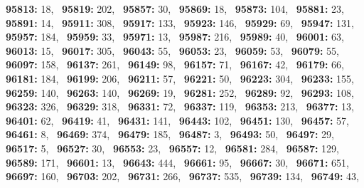 \textbf{95813:} 18,\allowbreak~ 
\textbf{95819:} 202,\allowbreak~ 
\textbf{95857:} 30,\allowbreak~ 
\textbf{95869:} 18,\allowbreak~ 
\textbf{95873:} 104,\allowbreak~ 
\textbf{95881:} 23,\allowbreak~ 
\textbf{95891:} 14,\allowbreak~ 
\textbf{95911:} 308,\allowbreak~ 
\textbf{95917:} 133,\allowbreak~ 
\textbf{95923:} 146,\allowbreak~ 
\textbf{95929:} 69,\allowbreak~ 
\textbf{95947:} 131,\allowbreak~ 
\textbf{95957:} 184,\allowbreak~ 
\textbf{95959:} 33,\allowbreak~ 
\textbf{95971:} 13,\allowbreak~ 
\textbf{95987:} 216,\allowbreak~ 
\textbf{95989:} 40,\allowbreak~ 
\textbf{96001:} 63,\allowbreak~ 
\textbf{96013:} 15,\allowbreak~ 
\textbf{96017:} 305,\allowbreak~ 
\textbf{96043:} 55,\allowbreak~ 
\textbf{96053:} 23,\allowbreak~ 
\textbf{96059:} 53,\allowbreak~ 
\textbf{96079:} 55,\allowbreak~ 
\textbf{96097:} 158,\allowbreak~ 
\textbf{96137:} 261,\allowbreak~ 
\textbf{96149:} 98,\allowbreak~ 
\textbf{96157:} 71,\allowbreak~ 
\textbf{96167:} 42,\allowbreak~ 
\textbf{96179:} 66,\allowbreak~ 
\textbf{96181:} 184,\allowbreak~ 
\textbf{96199:} 206,\allowbreak~ 
\textbf{96211:} 57,\allowbreak~ 
\textbf{96221:} 50,\allowbreak~ 
\textbf{96223:} 304,\allowbreak~ 
\textbf{96233:} 155,\allowbreak~ 
\textbf{96259:} 140,\allowbreak~ 
\textbf{96263:} 140,\allowbreak~ 
\textbf{96269:} 19,\allowbreak~ 
\textbf{96281:} 252,\allowbreak~ 
\textbf{96289:} 92,\allowbreak~ 
\textbf{96293:} 108,\allowbreak~ 
\textbf{96323:} 326,\allowbreak~ 
\textbf{96329:} 318,\allowbreak~ 
\textbf{96331:} 72,\allowbreak~ 
\textbf{96337:} 119,\allowbreak~ 
\textbf{96353:} 213,\allowbreak~ 
\textbf{96377:} 13,\allowbreak~ 
\textbf{96401:} 62,\allowbreak~ 
\textbf{96419:} 41,\allowbreak~ 
\textbf{96431:} 141,\allowbreak~ 
\textbf{96443:} 102,\allowbreak~ 
\textbf{96451:} 130,\allowbreak~ 
\textbf{96457:} 57,\allowbreak~ 
\textbf{96461:} 8,\allowbreak~ 
\textbf{96469:} 374,\allowbreak~ 
\textbf{96479:} 185,\allowbreak~ 
\textbf{96487:} 3,\allowbreak~ 
\textbf{96493:} 50,\allowbreak~ 
\textbf{96497:} 29,\allowbreak~ 
\textbf{96517:} 5,\allowbreak~ 
\textbf{96527:} 30,\allowbreak~ 
\textbf{96553:} 23,\allowbreak~ 
\textbf{96557:} 12,\allowbreak~ 
\textbf{96581:} 284,\allowbreak~ 
\textbf{96587:} 129,\allowbreak~ 
\textbf{96589:} 171,\allowbreak~ 
\textbf{96601:} 13,\allowbreak~ 
\textbf{96643:} 444,\allowbreak~ 
\textbf{96661:} 95,\allowbreak~ 
\textbf{96667:} 30,\allowbreak~ 
\textbf{96671:} 651,\allowbreak~ 
\textbf{96697:} 160,\allowbreak~ 
\textbf{96703:} 202,\allowbreak~ 
\textbf{96731:} 266,\allowbreak~ 
\textbf{96737:} 535,\allowbreak~ 
\textbf{96739:} 134,\allowbreak~ 
\textbf{96749:} 43,\allowbreak~ 
